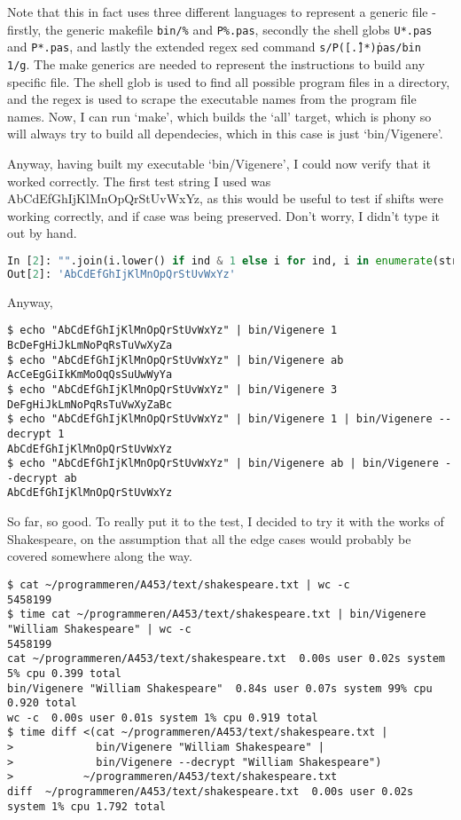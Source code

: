 \documentclass[fleqn,a4paper,11pt]{article}
\begin{document}
    Note that this in fact uses three different languages to represent a generic
    file - firstly, the generic makefile \texttt{bin/\%} and \texttt{P\%.pas},
    secondly the shell globs \texttt{U*.pas} and \texttt{P*.pas}, and lastly the
    extended regex sed command \texttt{s/P([\^.]*)\.pas/bin\/\\1/g}. The make
    generics are needed to represent the instructions to build any specific
    file. The shell glob is used to find all possible program files in a
    directory, and the regex is used to scrape the executable names from the
    program file names. Now, I can run `make', which builds the `all' target,
    which is phony so will always try to build all dependecies, which in this
    case is just `bin/Vigenere'.

    Anyway, having built my executable `bin/Vigenere', I could now verify that
    it worked correctly. The first test string I used was
    AbCdEfGhIjKlMnOpQrStUvWxYz, as this would be useful to test if shifts were
    working correctly, and if case was being preserved. Don't worry, I didn't
    type it out by hand.

\begin{lstlisting}[language=Python, caption=Alphabet]
In [2]: "".join(i.lower() if ind & 1 else i for ind, i in enumerate(string.ascii_uppercase))
Out[2]: 'AbCdEfGhIjKlMnOpQrStUvWxYz'
\end{lstlisting}

    Anyway,

\begin{lstlisting}[caption=Testing bin/Vigenere]
$ echo "AbCdEfGhIjKlMnOpQrStUvWxYz" | bin/Vigenere 1
BcDeFgHiJkLmNoPqRsTuVwXyZa
$ echo "AbCdEfGhIjKlMnOpQrStUvWxYz" | bin/Vigenere ab
AcCeEgGiIkKmMoOqQsSuUwWyYa
$ echo "AbCdEfGhIjKlMnOpQrStUvWxYz" | bin/Vigenere 3
DeFgHiJkLmNoPqRsTuVwXyZaBc
$ echo "AbCdEfGhIjKlMnOpQrStUvWxYz" | bin/Vigenere 1 | bin/Vigenere --decrypt 1
AbCdEfGhIjKlMnOpQrStUvWxYz
$ echo "AbCdEfGhIjKlMnOpQrStUvWxYz" | bin/Vigenere ab | bin/Vigenere --decrypt ab
AbCdEfGhIjKlMnOpQrStUvWxYz
\end{lstlisting}
\iffalse $ \fi %

    So far, so good. To really put it to the test, I decided to try it with the
    works of Shakespeare, on the assumption that all the edge cases would
    probably be covered somewhere along the way.

\begin{lstlisting}[caption=Shakespeare]
$ cat ~/programmeren/A453/text/shakespeare.txt | wc -c
5458199
$ time cat ~/programmeren/A453/text/shakespeare.txt | bin/Vigenere "William Shakespeare" | wc -c
5458199
cat ~/programmeren/A453/text/shakespeare.txt  0.00s user 0.02s system 5% cpu 0.399 total
bin/Vigenere "William Shakespeare"  0.84s user 0.07s system 99% cpu 0.920 total
wc -c  0.00s user 0.01s system 1% cpu 0.919 total
$ time diff <(cat ~/programmeren/A453/text/shakespeare.txt |
>             bin/Vigenere "William Shakespeare" |
>             bin/Vigenere --decrypt "William Shakespeare")
>           ~/programmeren/A453/text/shakespeare.txt
diff  ~/programmeren/A453/text/shakespeare.txt  0.00s user 0.02s system 1% cpu 1.792 total
\end{lstlisting}
\iffalse $ \fi %
\end{document}
